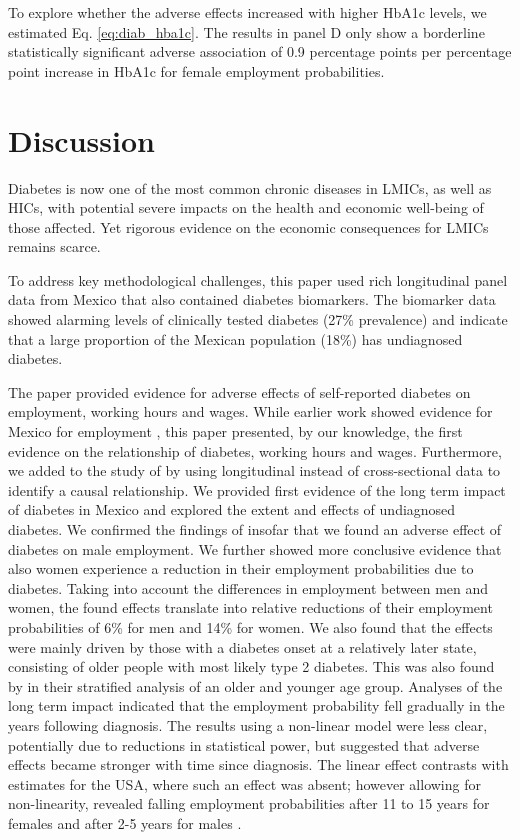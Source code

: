 \documentclass[12pt,english]{article}
\begin{document}
To explore whether the adverse effects increased with higher \ac{HbA1c} levels, we estimated Eq. \ref{eq:diab_hba1c}. The results in panel D only show a borderline statistically significant adverse association of 0.9 percentage points per percentage point increase in \ac{HbA1c} for female employment probabilities.


\FloatBarrier
	
\section{\label{sec:cha_4_conclusion}Discussion}

Diabetes is now one of the most common chronic diseases in \acp{LMIC}, as well as \acp{HIC}, with potential severe impacts on the health and economic well-being of those affected.  Yet rigorous evidence on the economic consequences for \acp{LMIC} remains scarce.

To address key methodological challenges, this paper used rich longitudinal panel data from Mexico that also contained diabetes biomarkers. The biomarker data showed alarming levels of clinically tested diabetes (27\% prevalence) and indicate that a large proportion of the Mexican population (18\%) has undiagnosed diabetes.

The paper provided evidence for adverse effects of self-reported diabetes on employment, working hours and wages. While earlier work showed evidence for Mexico for employment \parencite{Seuring2015}, this paper presented, by our knowledge, the first evidence on the relationship of diabetes, working hours and wages. Furthermore, we added to the study of \textcite{Seuring2015} by using longitudinal instead of cross-sectional data to identify a causal relationship. We provided first evidence of the long term impact of diabetes in Mexico and explored the extent and effects of undiagnosed diabetes. We confirmed the findings of \textcite{Seuring2015} insofar that we found an adverse effect of diabetes on male employment. We further showed more conclusive evidence that also women experience a reduction in their employment probabilities due to diabetes. Taking into account the differences in employment between men and women, the found effects translate into relative reductions of their employment probabilities of 6\% for men and 14\% for women. We also found that the effects were mainly driven by those with a diabetes onset at a relatively later state, consisting of older people with most likely type 2 diabetes. This was also found by \textcite{Seuring2015} in their stratified analysis of an older and younger age group. Analyses of the long term impact indicated that the employment probability fell gradually in the years following diagnosis. The results using a non-linear model were less clear, potentially due to reductions in statistical power, but suggested that adverse effects became stronger with time since diagnosis. The linear effect contrasts with estimates for the USA, where such an effect was absent; however allowing for non-linearity, revealed falling employment probabilities after 11 to 15 years for females and after 2-5 years for males \parencite{Minor2013}.
\end{document}
